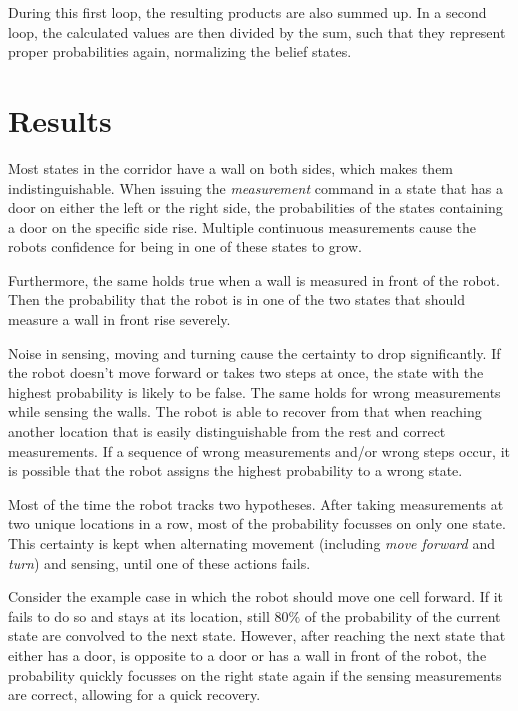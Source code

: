 \documentclass[10pt,a4paper]{article}
\begin{document}
		During this first loop, the resulting products are also summed up. In a second loop, the calculated values are then divided by the sum, such that they represent proper probabilities again, normalizing the belief states.
	
	\section{Results}	
	Most states in the corridor have a wall on both sides, which makes them indistinguishable. When issuing the \textit{measurement} command in a state that has a door on either the left or the right side, the probabilities of the states containing a door on the specific side rise. Multiple continuous measurements cause the robots confidence for being in one of these states to grow.
	
	Furthermore, the same holds true when a wall is measured in front of the robot. Then the probability that the robot is in one of the two states that should measure a wall in front rise severely.
	
	Noise in sensing, moving and turning cause the certainty to drop significantly. If the robot doesn't move forward or takes two steps at once, the state with the highest probability is likely to be false. The same holds for wrong measurements while sensing the walls. The robot is able to recover from that when reaching another location that is easily distinguishable from the rest and correct measurements. If a sequence of wrong measurements and/or wrong steps occur, it is possible that the robot assigns the highest probability to a wrong state. 
	
	Most of the time the robot tracks two hypotheses. After taking measurements at two unique locations in a row, most of the probability focusses on only one state. This certainty is kept when alternating movement (including \textit{move forward} and \textit{turn}) and sensing, until one of these actions fails.
	
	Consider the example case in which the robot should move one cell forward. If it fails to do so and stays at its location, still $80\%$ of the probability of the current state are convolved to the next state. However, after reaching the next state that either has a door, is opposite to a door or has a wall in front of the robot, the probability quickly focusses on the right state again if the sensing measurements are correct, allowing for a quick recovery.
	
\end{document}

